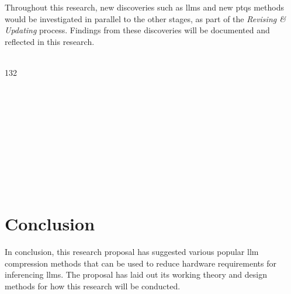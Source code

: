 \documentclass{ifacconf}
\begin{document}
	Throughout this research, new discoveries such as \glspl{llm} and new \glspl{ptq} methods would be investigated in parallel to the other stages, as part of the \textit{Revising \& Updating} process. Findings from these discoveries will be documented and reflected in this research.\\\\
	
	\begin{strip}
		\begin{minipage}{\textwidth}\centering
			\begin{ganttchart}[
				y unit title=0.4cm,
				y unit chart=0.5cm,
				vgrid,hgrid,
				x unit=0.4cm,
				title label anchor/.style={below=-1.6ex},
				bar/.style={fill=blue!30},
				milestone/.style={shape=circle, fill=green!30},
				group/.style={fill=orange!30},
				title left shift=.05,
				title right shift=-.05,
				title height=1,
				progress label text={},
				bar height=0.7,
				group right shift=0,
				group top shift=.6,
				group height=.3]{1}{32}
				
				 \\
				\\
				
				\\
				\\
				\\
				\\
				\\
				\\
				
				\\
			\end{ganttchart}
		\end{minipage}
	\end{strip}
	
	\section{Conclusion}
	In conclusion, this research proposal has suggested various popular \gls{llm} compression methods that can be used to reduce hardware requirements for inferencing \glspl{llm}. The proposal has laid out its working theory and design methods for how this research will be conducted.
	
\end{document}
